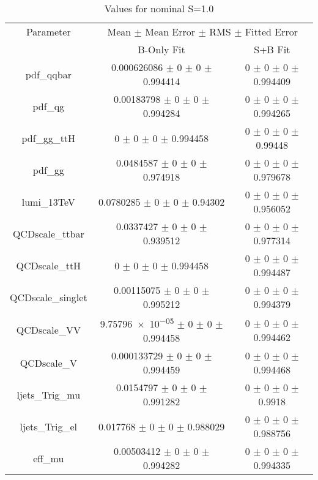 \begin{table}
\centering
\caption{Values for nominal S=1.0}
\begin{tabular}{ccc}
\toprule
Parameter 	& \multicolumn{2}{c}{Mean $\pm$ Mean Error $\pm$ RMS $\pm$ Fitted Error}\\
 	& B-Only Fit & S+B Fit\\
\midrule
pdf\_qqbar 	& \num{0.000626086} $\pm$ \num{0} $\pm$ \num{0} $\pm$ \num{0.994414} 	& \num{0} $\pm$ \num{0} $\pm$ \num{0} $\pm$ \num{0.994409}\\
pdf\_qg 	& \num{0.00183798} $\pm$ \num{0} $\pm$ \num{0} $\pm$ \num{0.994284} 	& \num{0} $\pm$ \num{0} $\pm$ \num{0} $\pm$ \num{0.994265}\\
pdf\_gg\_ttH 	& \num{0} $\pm$ \num{0} $\pm$ \num{0} $\pm$ \num{0.994458} 	& \num{0} $\pm$ \num{0} $\pm$ \num{0} $\pm$ \num{0.99448}\\
pdf\_gg 	& \num{0.0484587} $\pm$ \num{0} $\pm$ \num{0} $\pm$ \num{0.974918} 	& \num{0} $\pm$ \num{0} $\pm$ \num{0} $\pm$ \num{0.979678}\\
lumi\_13TeV 	& \num{0.0780285} $\pm$ \num{0} $\pm$ \num{0} $\pm$ \num{0.94302} 	& \num{0} $\pm$ \num{0} $\pm$ \num{0} $\pm$ \num{0.956052}\\
QCDscale\_ttbar 	& \num{0.0337427} $\pm$ \num{0} $\pm$ \num{0} $\pm$ \num{0.939512} 	& \num{0} $\pm$ \num{0} $\pm$ \num{0} $\pm$ \num{0.977314}\\
QCDscale\_ttH 	& \num{0} $\pm$ \num{0} $\pm$ \num{0} $\pm$ \num{0.994458} 	& \num{0} $\pm$ \num{0} $\pm$ \num{0} $\pm$ \num{0.994487}\\
QCDscale\_singlet 	& \num{0.00115075} $\pm$ \num{0} $\pm$ \num{0} $\pm$ \num{0.995212} 	& \num{0} $\pm$ \num{0} $\pm$ \num{0} $\pm$ \num{0.994379}\\
QCDscale\_VV 	& \num{9.75796e-05} $\pm$ \num{0} $\pm$ \num{0} $\pm$ \num{0.994458} 	& \num{0} $\pm$ \num{0} $\pm$ \num{0} $\pm$ \num{0.994462}\\
QCDscale\_V 	& \num{0.000133729} $\pm$ \num{0} $\pm$ \num{0} $\pm$ \num{0.994459} 	& \num{0} $\pm$ \num{0} $\pm$ \num{0} $\pm$ \num{0.994468}\\
ljets\_Trig\_mu 	& \num{0.0154797} $\pm$ \num{0} $\pm$ \num{0} $\pm$ \num{0.991282} 	& \num{0} $\pm$ \num{0} $\pm$ \num{0} $\pm$ \num{0.9918}\\
ljets\_Trig\_el 	& \num{0.017768} $\pm$ \num{0} $\pm$ \num{0} $\pm$ \num{0.988029} 	& \num{0} $\pm$ \num{0} $\pm$ \num{0} $\pm$ \num{0.988756}\\
eff\_mu 	& \num{0.00503412} $\pm$ \num{0} $\pm$ \num{0} $\pm$ \num{0.994282} 	& \num{0} $\pm$ \num{0} $\pm$ \num{0} $\pm$ \num{0.994335}\\

\end{tabular}
\end{table}

